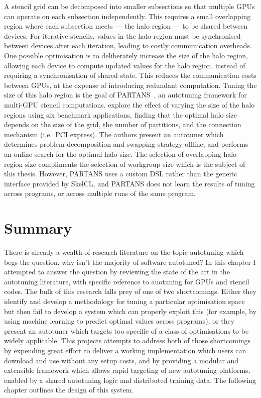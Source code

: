A stencil grid can be decomposed into smaller subsections so that
multiple GPUs can operate on each subsection independently. This
requires a small overlapping region where each subsection meets ---
the halo region --- to be shared between devices. For iterative
stencils, values in the halo region must be synchronised between
devices after each iteration, leading to costly communication
overheads. One possible optimisation is to deliberately increase the
size of the halo region, allowing each device to compute updated
values for the halo region, instead of requiring a synchronisation of
shared state. This reduces the communication costs between GPUs, at
the expense of introducing redundant computation. Tuning the size of
this halo region is the goal of PARTANS~\cite{Lutz2013}, an autotuning
framework for multi-GPU stencil computations. \citeauthor{Lutz2013}
explore the effect of varying the size of the halo regions using six
benchmark applications, finding that the optimal halo size depends on
the size of the grid, the number of partitions, and the connection
mechanism (i.e.\ PCI express). The authors present an autotuner which
determines problem decomposition and swapping strategy offline, and
performs an online search for the optimal halo size. The selection of
overlapping halo region size compliments the selection of workgroup
size which is the subject of this thesis. However, PARTANS uses a
custom DSL rather than the generic interface provided by SkelCL, and
PARTANS does not learn the results of tuning across programs, or
across multiple runs of the same program.


\section{Summary}

There is already a wealth of research literature on the topic
autotuning which begs the question, why isn't the majority of software
autotuned? In this chapter I attempted to answer the question by
reviewing the state of the art in the autotuning literature, with
specific reference to auotuning for GPUs and stencil codes. The bulk
of this research falls prey of one of two shortcomings. Either they
identify and develop a methodology for tuning a particular
optimisation space but then fail to develop a system which can
properly exploit this (for example, by using machine learning to
predict optimal values across programs), or they present an autotuner
which targets too specific of a class of optimisations to be widely
applicable. This projects attempts to address both of those
shortcomings by expending great effort to deliver a working
implementation which users can download and use without any setup
costs, and by providing a modular and extensible framework which
allows rapid targeting of new autotuning platforms, enabled by a
shared autotuning logic and distributed training data. The following
chapter outlines the design of this system.

